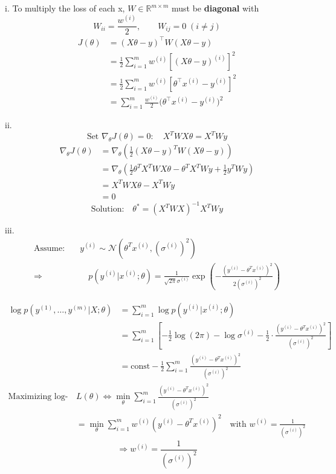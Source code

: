 
\begin{answer}
i. To multiply the loss of each x, $W\in\mathbb{R}^{m\times m}$ must be \textbf{diagonal} with
      \[
          W_{ii}=\frac{w^{(i)}}{2},\qquad W_{ij}=0\;(i\neq j)
      \]
$$
\begin{aligned}
J(\theta) &= (X\theta - y)^\top W (X\theta - y) \\
&= \frac{1}{2} \sum_{i=1}^m w^{(i)} \left[(X\theta - y)^{(i)}\right]^2 \\
&= \frac{1}{2} \sum_{i=1}^m w^{(i)} \left[\theta^\top x^{(i)} - y^{(i)}\right]^2 \\
&= \sum_{i=1}^{m}\frac{w^{(i)}}{2} \bigl(\theta^\top x^{(i)} - y^{(i)}\bigr)^2
\end{aligned}
$$

ii. $$
\text{Set } \nabla_{\theta} J(\theta) = 0:
\quad X^T W X \theta = X^T W y
$$
$$
\begin{aligned}
\nabla_{\theta} J(\theta)
&= \nabla_{\theta} \left( \frac{1}{2}(X\theta - y)^T W (X\theta - y) \right) \\
&= \nabla_{\theta} \left( \frac{1}{2} \theta^T X^T W X \theta - \theta^T X^T W y + \frac{1}{2} y^T W y \right) \\
&= X^T W X \theta - X^T W y\\
&=0
\end{aligned}
$$
$$
\text{Solution:}\quad \boxed{\theta^\ast = (X^T W X)^{-1} X^T W y}
$$

iii. $$
\begin{aligned}
\text{Assume:}\quad & y^{(i)} \sim \mathcal{N}(\theta^T x^{(i)}, (\sigma^{(i)})^2) \\
\Rightarrow &\quad p(y^{(i)} | x^{(i)}; \theta) = \frac{1}{\sqrt{2\pi} \sigma^{(i)}} \exp\left( -\frac{(y^{(i)} - \theta^T x^{(i)})^2}{2 (\sigma^{(i)})^2} \right)
\end{aligned}
$$

$$
\begin{aligned}
\log p(y^{(1)},\dots,y^{(m)} | X;\theta)
&= \sum_{i=1}^m \log p(y^{(i)} | x^{(i)}; \theta) \\
&= \sum_{i=1}^m \left[ -\frac{1}{2} \log(2\pi) - \log \sigma^{(i)} - \frac{1}{2} \cdot \frac{(y^{(i)} - \theta^T x^{(i)})^2}{(\sigma^{(i)})^2} \right] \\
&= \text{const} - \frac{1}{2} \sum_{i=1}^m \frac{(y^{(i)} - \theta^T x^{(i)})^2}{(\sigma^{(i)})^2}
\end{aligned}
$$
$$
\begin{aligned}
\text{Maximizing log-likelihood } &L(\theta) \Leftrightarrow \min_\theta \sum_{i=1}^m \frac{(y^{(i)} - \theta^T x^{(i)})^2}{(\sigma^{(i)})^2} \\
&= \min_\theta \sum_{i=1}^m w^{(i)} (y^{(i)} - \theta^T x^{(i)})^2 \quad \text{with } w^{(i)} = \frac{1}{(\sigma^{(i)})^2}
\end{aligned}
$$
$$
\Rightarrow \boxed{ w^{(i)} = \frac{1}{(\sigma^{(i)})^2}}
$$



\end{answer}

